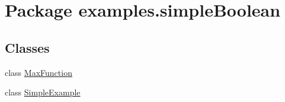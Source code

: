 \hypertarget{namespaceexamples_1_1simple_boolean}{\section{Package examples.\-simple\-Boolean}
\label{namespaceexamples_1_1simple_boolean}
}
\subsection*{Classes}
\begin{DoxyCompactItemize}
\item 
class \hyperlink{classexamples_1_1simple_boolean_1_1_max_function}{Max\-Function}
\item 
class \hyperlink{classexamples_1_1simple_boolean_1_1_simple_example}{Simple\-Example}
\end{DoxyCompactItemize}
